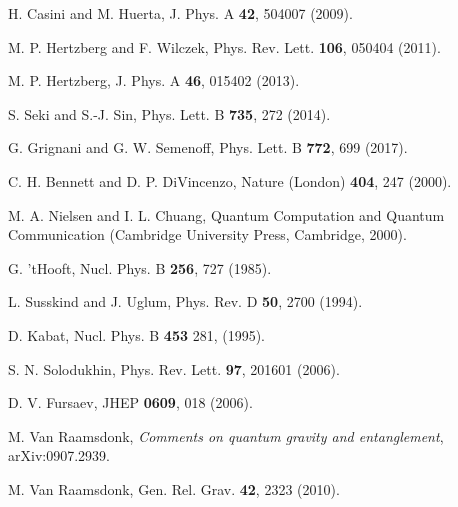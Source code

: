 \documentclass[aps,showpacs,showkeys]{revtex4}
\begin{document}
\begin{thebibliography}{0}
H. Casini and M. Huerta, J. Phys. A {\bf 42}, 504007 (2009).  

M. P. Hertzberg and F. Wilczek, Phys. Rev. Lett. {\bf 106}, 050404 (2011).

M. P. Hertzberg, J. Phys. A {\bf 46}, 015402 (2013).

S. Seki and S.-J. Sin, Phys. Lett. B {\bf 735}, 272 (2014). 

G. Grignani and G. W. Semenoff, Phys. Lett. B {\bf 772}, 699 (2017).

C. H. Bennett and D. P. DiVincenzo, Nature (London) {\bf 404}, 247 (2000).

M. A. Nielsen and I. L. Chuang, Quantum Computation
and Quantum Communication (Cambridge University Press, Cambridge, 2000).

G. 'tHooft, Nucl. Phys. B {\bf 256}, 727 (1985).
 
L. Susskind and J. Uglum, Phys. Rev. D {\bf 50}, 2700 (1994).

D. Kabat, Nucl. Phys. B {\bf 453} 281, (1995).

S. N. Solodukhin, Phys. Rev. Lett. {\bf 97}, 201601 (2006).

D. V. Fursaev, JHEP {\bf 0609}, 018 (2006).

M. Van Raamsdonk, {\it Comments on quantum gravity and entanglement},
arXiv:0907.2939.

M. Van Raamsdonk, Gen. Rel. Grav. {\bf 42}, 2323 (2010).


\end{thebibliography}
\end{document}
